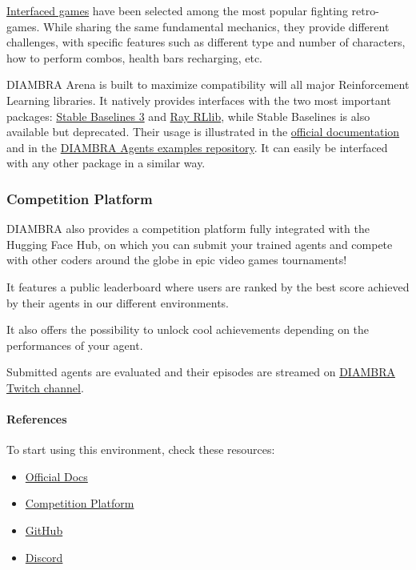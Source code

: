 \documentclass[11pt,a4paper]{article}
\begin{document}
\href{https://docs.diambra.ai/envs/games/}{Interfaced games} have been selected among the most popular fighting retro-games. While sharing the same fundamental mechanics, they provide different challenges, with specific features such as different type and number of characters, how to perform combos, health bars recharging, etc.

DIAMBRA Arena is built to maximize compatibility will all major Reinforcement Learning libraries. It natively provides interfaces with the two most important packages: \href{https://stable-baselines3.readthedocs.io/en/master/}{Stable Baselines 3} and \href{https://docs.ray.io/en/latest/rllib/index.html}{Ray RLlib}, while Stable Baselines is also available but deprecated. Their usage is illustrated in the \href{https://docs.diambra.ai/}{official documentation} and in the \href{https://github.com/diambra/agents}{DIAMBRA Agents examples repository}. It can easily be interfaced with any other package in a similar way.

\subsubsection{Competition Platform}\label{competition-platform}

DIAMBRA also provides a competition platform fully integrated with the Hugging Face Hub, on which you can submit your trained agents and compete with other coders around the globe in epic video games tournaments!

It features a public leaderboard where users are ranked by the best score achieved by their agents in our different environments.

It also offers the possibility to unlock cool achievements depending on the performances of your agent.

Submitted agents are evaluated and their episodes are streamed on \href{https://www.twitch.tv/diambra_ai}{DIAMBRA Twitch channel}.

\paragraph{References}\label{references}

To start using this environment, check these resources:

\begin{itemize}
\item
  \href{https://docs.diambra.ai/}{Official Docs}
\item
  \href{https://diambra.ai}{Competition Platform}
\item
  \href{https://github.com/diambra/}{GitHub}
\item
  \href{https://diambra.ai/discord}{Discord}
\end{itemize}
\end{document}
